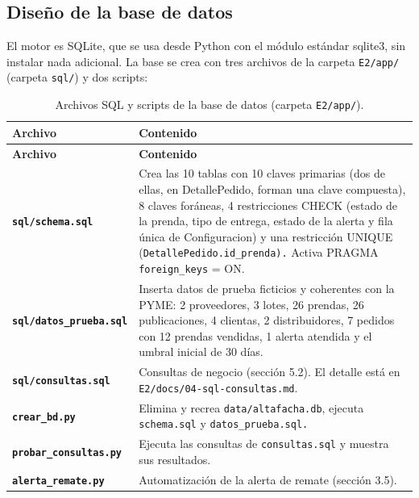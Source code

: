 \documentclass[11pt,letterpaper]{article}
\begin{document}
\subsection{Diseño de la base de datos}

El motor es SQLite, que se usa desde Python con el módulo estándar sqlite3, sin instalar nada adicional. La base se crea con tres archivos de la carpeta \texttt{E2/\allowbreak{}app/\allowbreak{}} (carpeta \texttt{sql/}) y dos scripts:
{\footnotesize
\setlength{\tabcolsep}{3pt}\renewcommand{\arraystretch}{1.15}
\begin{longtable}{>{\raggedright\arraybackslash}p{}>{\raggedright\arraybackslash}p{}}
\caption{Archivos SQL y scripts de la base de datos (carpeta \texttt{E2/\allowbreak{}app/}).}\\
\hline
\rowcolor[HTML]{D9EAF7}\textbf{\textbf{Archivo}} & \textbf{\textbf{Contenido}} \\
\hline
\endfirsthead
\hline
\rowcolor[HTML]{D9EAF7}\textbf{\textbf{Archivo}} & \textbf{\textbf{Contenido}} \\
\hline
\endhead
\textbf{\texttt{sql/\allowbreak{}schema.sql}} & Crea las 10 tablas con 10 claves primarias (dos de ellas, en DetallePedido, forman una clave compuesta), 8 claves foráneas, 4 restricciones CHECK (estado de la prenda, tipo de entrega, estado de la alerta y fila única de Configuracion) y una restricción UNIQUE (\texttt{DetallePedido.id\_\allowbreak{}prenda).} Activa PRAGMA \texttt{foreign\_\allowbreak{}keys} = ON. \\
\hline
\textbf{\texttt{sql/\allowbreak{}datos\_\allowbreak{}prueba.sql}} & Inserta datos de prueba ficticios y coherentes con la PYME: 2 proveedores, 3 lotes, 26 prendas, 26 publicaciones, 4 clientas, 2 distribuidores, 7 pedidos con 12 prendas vendidas, 1 alerta atendida y el umbral inicial de 30 días. \\
\hline
\textbf{\texttt{sql/\allowbreak{}consultas.sql}} & Consultas de negocio (sección 5.2). El detalle está en \texttt{E2/\allowbreak{}docs/\allowbreak{}04-sql-consultas.md}. \\
\hline
\textbf{\texttt{crear\_\allowbreak{}bd.py}} & Elimina y recrea \texttt{data/\allowbreak{}altafacha.db}, ejecuta \texttt{schema.sql} y \texttt{datos\_\allowbreak{}prueba.sql.} \\
\hline
\textbf{\texttt{probar\_\allowbreak{}consultas.py}} & Ejecuta las consultas de \texttt{consultas.sql} y muestra sus resultados. \\
\hline
\textbf{\texttt{alerta\_\allowbreak{}remate.py}} & Automatización de la alerta de remate (sección 3.5). \\
\hline
\end{longtable}
}
\end{document}
